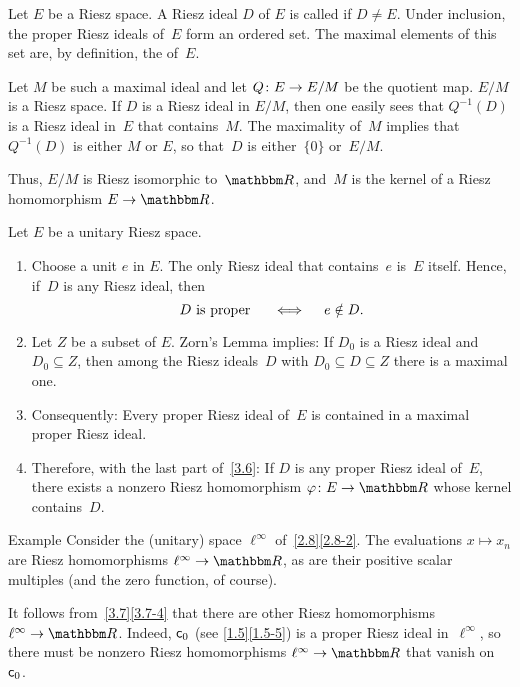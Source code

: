 \documentclass[main.tex]{subfiles}
\begin{document}
\begin{psec}{3.6}%
Let $E$ be a Riesz space.
A Riesz ideal $D$ of $E$ is called 
if $D\neq E$.
Under inclusion,
the proper Riesz ideals of~$E$
form an ordered set.
The maximal elements of this set are,
by definition,
the  of~$E$.

Let $M$ be such a maximal ideal and 
let $Q\colon E\rightarrow E/M$ be the quotient map.
$E/M$ is a Riesz space.
If $D$ is a Riesz ideal in $E/M$,
then one easily sees 
that $Q^{-1}(D)$ is a Riesz ideal in~$E$
that contains~$M$.
The maximality of~$M$ 
implies that~$Q^{-1}(D)$ is either $M$ or $E$,
so that~$D$ is either~$\{ 0\}$ or~$E/M$.

Thus, $E/M$ is Riesz isomorphic to~$\R$,
and~$M$ is the kernel of a Riesz homomorphism
$E\ra \R$.
\end{psec}
%
%
\begin{psec}{3.7}%
Let $E$ be a unitary Riesz space.
\begin{enumerate}
\item \label{3.7-1}
Choose a unit $e$ in $E$. 
The only Riesz ideal that contains~$e$ is~$E$ itself.
Hence, if~$D$ is any Riesz ideal, then
\begin{equation*}
D\text{ is proper }\quad \iff \quad e\notin D\text{.}
\end{equation*}
%
\item \label{3.7-2}
Let $Z$ be a subset of $E$.
Zorn's Lemma implies:
If $D_0$ is a Riesz ideal
and~$D_0\subseteq Z$,
then among the Riesz ideals~$D$ 
with $D_0\subseteq D\subseteq Z$
there is a maximal one.
%
\item \label{3.7-3}
Consequently:
Every proper Riesz ideal of~$E$
is contained in a maximal proper Riesz ideal.
%
\item \label{3.7-4}
Therefore,
with the last part of~\ref{3.6}:
If $D$ is any proper Riesz ideal of~$E$,
there exists a nonzero Riesz homomorphism
$\varphi\colon E\ra\R$ whose kernel contains~$D$.
\end{enumerate}
\end{psec}
%
%
\begin{psec}{3.8}{Example}
Consider the (unitary) space $\ell^\infty$
of~\ref{2.8}\ref{2.8-2}.
The evaluations $x\mapsto x_n$ 
are Riesz homomorphisms $\ell^\infty\ra \R$,
as are their positive scalar multiples
(and the zero function, of course).

It follows from~\ref{3.7}\ref{3.7-4}
that there are other Riesz homomorphisms
$\ell^\infty \ra \R$.
Indeed,
$\mathsf{c}_0$ (see \ref{1.5}\ref{1.5-5}) 
is a proper Riesz ideal in~$\ell^\infty$,
so there must be nonzero Riesz homomorphisms
$\ell^\infty\ra \R$ that vanish on~$\mathsf{c}_0$.
\end{psec}
\end{document}
